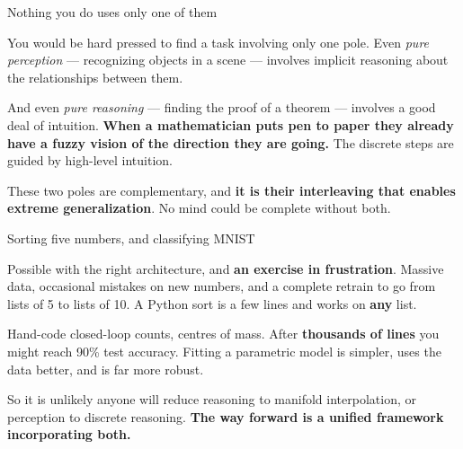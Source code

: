 \documentclass[aspectratio=169,11pt,t]{beamer}
\begin{document}
\begin{frame}[shrink=25]{Nothing you do uses only one of them}
{\fontsize{9.4}{12.6}\selectfont\color{fg2}You would be hard pressed to find a task involving only one pole. Even \textit{pure perception} --- recognizing objects in a scene --- involves implicit reasoning about the relationships between them.\par}\vskip 4pt
{\fontsize{9.4}{12.6}\selectfont\color{fg2}And even \textit{pure reasoning} --- finding the proof of a theorem --- involves a good deal of intuition. \textbf{When a mathematician puts pen to paper they already have a fuzzy vision of the direction they are going.} The discrete steps are guided by high-level intuition.\par}\vskip 4pt
\begin{iband}[signal]
These two poles are complementary, and \textbf{it is their interleaving that enables extreme generalization}. No mind could be complete without both.
\end{iband}
\end{frame}

\begin{frame}[shrink=25]{Sorting five numbers, and classifying MNIST}
\begin{minipage}[t]{0.494\textwidth}
\begin{icardbad}
Possible with the right architecture, and \textbf{an exercise in frustration}. Massive data, occasional mistakes on new numbers, and a complete retrain to go from lists of 5 to lists of 10. A Python sort is a few lines and works on \textbf{any} list.
\end{icardbad}
\end{minipage}%
\hfill
\begin{minipage}[t]{0.494\textwidth}
\begin{icardbad}
Hand-code closed-loop counts, centres of mass. After \textbf{thousands of lines} you might reach 90\% test accuracy. Fitting a parametric model is simpler, uses the data better, and is far more robust.
\end{icardbad}
\end{minipage}%
\begin{iband}[signal]
So it is unlikely anyone will reduce reasoning to manifold interpolation, or perception to discrete reasoning. \textbf{The way forward is a unified framework incorporating both.}
\end{iband}
\end{frame}
\end{document}
